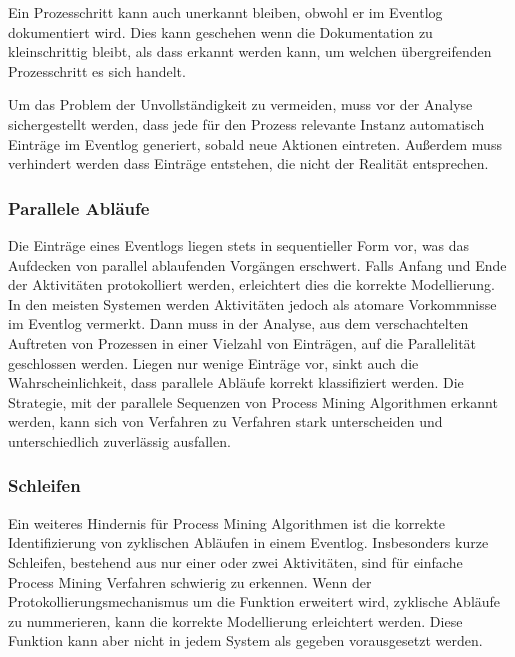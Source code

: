 Ein Prozesschritt kann auch unerkannt bleiben, obwohl er im Eventlog dokumentiert wird. Dies kann geschehen wenn die Dokumentation zu kleinschrittig bleibt, als dass erkannt werden kann, um welchen übergreifenden Prozesschritt es sich handelt. 

Um das Problem der Unvollständigkeit zu vermeiden, muss vor der Analyse sichergestellt werden, dass jede für den Prozess relevante Instanz automatisch Einträge im Eventlog generiert, sobald neue Aktionen eintreten. Außerdem muss  verhindert werden dass Einträge entstehen, die nicht der Realität entsprechen.

\subsubsection{Parallele Abläufe}
Die Einträge eines Eventlogs liegen stets in sequentieller Form vor, was das Aufdecken von parallel ablaufenden Vorgängen erschwert. Falls Anfang und Ende der Aktivitäten protokolliert werden, erleichtert dies die korrekte Modellierung. In den meisten Systemen werden Aktivitäten jedoch als atomare Vorkommnisse im Eventlog vermerkt. Dann muss in der Analyse, aus dem verschachtelten Auftreten von Prozessen in einer Vielzahl von Einträgen, auf die Parallelität geschlossen werden. Liegen nur wenige Einträge vor, sinkt auch die Wahrscheinlichkeit, dass parallele Abläufe korrekt klassifiziert werden. Die Strategie, mit der parallele Sequenzen von Process Mining Algorithmen erkannt werden, kann sich von Verfahren zu Verfahren stark unterscheiden und unterschiedlich zuverlässig ausfallen.

\subsubsection{Schleifen}
Ein weiteres Hindernis für Process Mining Algorithmen ist die korrekte Identifizierung von zyklischen Abläufen in einem Eventlog. Insbesonders kurze Schleifen, bestehend aus nur einer oder zwei Aktivitäten, sind für einfache Process Mining Verfahren schwierig zu erkennen. 
Wenn der Protokollierungsmechanismus um die Funktion erweitert wird, zyklische Abläufe zu nummerieren, kann die korrekte Modellierung erleichtert werden. Diese Funktion kann aber nicht in jedem System als gegeben vorausgesetzt werden.


